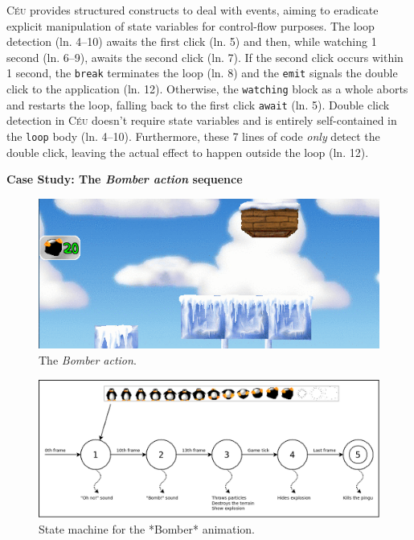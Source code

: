\documentclass{vgtc}                          %
\newcommand{\CEU}{\textsc{C\'{e}u}\xspace}
\newcommand{\code}[1] {{\small{\texttt{#1}}}}
\begin{document}
\CEU provides structured constructs to deal with events, aiming to eradicate
explicit manipulation of state variables for control-flow purposes.
%
The loop detection (ln. 4--10) awaits the first click (ln. 5) and then, while
watching 1 second (ln. 6--9), awaits the second click (ln. 7).
If the second click occurs within 1 second, the \code{break} terminates the
loop (ln. 8) and the \code{emit} signals the double click to the application
(ln. 12).
Otherwise, the \code{watching} block as a whole aborts and restarts the loop, 
falling back to the first click \code{await} (ln. 5).
%
Double click detection in \CEU doesn't require state variables and is entirely
self-contained in the \code{loop} body (ln. 4--10).
Furthermore, these 7 lines of code \emph{only} detect the double click, leaving
the actual effect to happen outside the loop (ln. 12).

\textbf{Case Study: The \emph{Bomber action} sequence}

\begin{figure}[t]
\centering
\includegraphics[width=\columnwidth]{bomber-anim}
\caption{ The \emph{Bomber action}.
\label{fig.bomber.anim}
}
\end{figure}

\begin{figure}[t]
\centering
\includegraphics[width=\columnwidth]{bomber-state}
\caption{ State machine for the *Bomber* animation.
\label{fig.bomber.state}
}
\end{figure}
\end{document}
